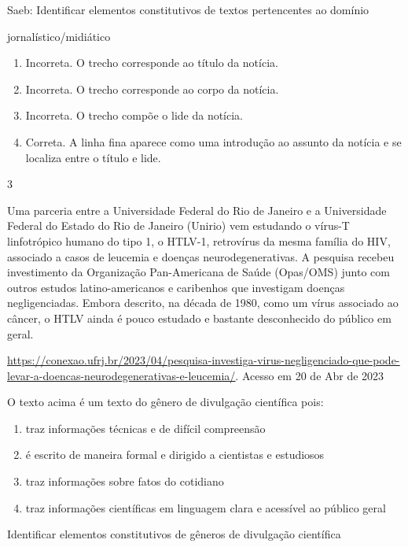 {{\begin{escolha}
{\begin{itemize}
\begin{itemize}
Saeb: Identificar elementos constitutivos de textos pertencentes ao
domínio

jornalístico/midiático

\begin{enumerate}
\def\labelenumi{\arabic{enumi}.}
\item
  Incorreta. O trecho corresponde ao título da notícia.
\item
  Incorreta. O trecho corresponde ao corpo da notícia.
\item
  Incorreta. O trecho compõe o lide da notícia.
\item
  Correta. A linha fina aparece como uma introdução ao assunto da
  notícia e se localiza entre o título e lide.
\end{enumerate}

\num{3}

Uma parceria entre a Universidade Federal do Rio de Janeiro e a
Universidade Federal do Estado do Rio de Janeiro (Unirio) vem estudando
o vírus-T linfotrópico humano do tipo 1, o HTLV-1, retrovírus da mesma
família do HIV, associado a casos de leucemia e doenças
neurodegenerativas. A pesquisa recebeu investimento da Organização
Pan-Americana de Saúde (Opas/OMS) junto com outros estudos
latino-americanos e caribenhos que investigam doenças negligenciadas.
Embora descrito, na década de 1980, como um vírus associado ao câncer, o
HTLV ainda é pouco estudado e bastante desconhecido do público em geral.

\href{https://conexao.ufrj.br/2023/04/pesquisa-investiga-virus-negligenciado-que-pode-levar-a-doencas-neurodegenerativas-e-leucemia/}{\uline{https://conexao.ufrj.br/2023/04/pesquisa-investiga-virus-negligenciado-que-pode-levar-a-doencas-neurodegenerativas-e-leucemia/}}.
Acesso em 20 de Abr de 2023

O texto acima é um texto do gênero de divulgação científica pois:

\begin{enumerate}
\def\labelenumi{\alph{enumi})}
\item
  traz informações técnicas e de difícil compreensão
\item
  é escrito de maneira formal e dirigido a cientistas e estudiosos
\item
  traz informações sobre fatos do cotidiano
\item
  traz informações científicas em linguagem clara e acessível ao público
  geral
\end{enumerate}

Identificar elementos constitutivos de gêneros de divulgação científica


\end{itemize}
\end{itemize}}
\end{escolha}}}

